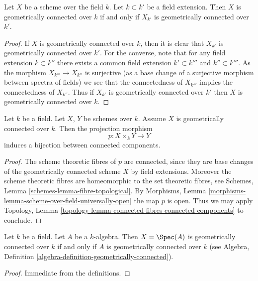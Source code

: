 \begin{lemma}
\label{lemma-geometrically-connected-check-after-extension}
Let $X$ be a scheme over the field $k$.
Let $k \subset k'$ be a field extension.
Then $X$ is geometrically connected over $k$ if and only if
$X_{k'}$ is geometrically connected over $k'$.
\end{lemma}

\begin{proof}
If $X$ is geometrically connected over $k$, then it is clear that
$X_{k'}$ is geometrically connected over $k'$. For the converse, note
that for any field extension $k \subset k''$ there exists a common
field extension $k' \subset k'''$ and $k'' \subset k'''$. As the
morphism $X_{k'''} \to X_{k''}$ is surjective (as a base change of
a surjective morphism between spectra of fields) we see that the
connectedness of $X_{k'''}$ implies the connectedness of $X_{k''}$.
Thus if $X_{k'}$ is geometrically connected over $k'$ then
$X$ is geometrically connected over $k$.
\end{proof}

\begin{lemma}
\label{lemma-bijection-connected-components}
Let $k$ be a field.
Let $X$, $Y$ be schemes over $k$.
Assume $X$ is geometrically connected over $k$.
Then the projection morphism
$$
p : X \times_k Y \longrightarrow Y
$$
induces a bijection between connected components.
\end{lemma}

\begin{proof}
The scheme theoretic fibres of $p$ are connected, since they
are base changes of the geometrically connected scheme $X$ by
field extensions. Moreover the scheme theoretic fibres are
homeomorphic to the set theoretic fibres, see
Schemes, Lemma \ref{schemes-lemma-fibre-topological}.
By
Morphisms, Lemma \ref{morphisms-lemma-scheme-over-field-universally-open}
the map $p$ is open.
Thus we may apply Topology,
Lemma \ref{topology-lemma-connected-fibres-connected-components}
to conclude.
\end{proof}

\begin{lemma}
\label{lemma-affine-geometrically-connected}
Let $k$ be a field.
Let $A$ be a $k$-algebra.
Then $X = \Spec(A)$ is geometrically connected over $k$
if and only if $A$ is geometrically connected over $k$ (see
Algebra, Definition \ref{algebra-definition-geometrically-connected}).
\end{lemma}

\begin{proof}
Immediate from the definitions.
\end{proof}

